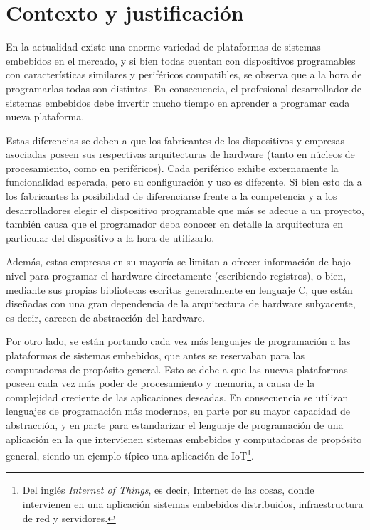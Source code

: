 \section{Contexto y justificación}
\label{sec:contextoYJustificacion}

En la actualidad existe una enorme variedad de plataformas de sistemas embebidos en el mercado, y si bien todas cuentan con dispositivos programables con características similares y periféricos compatibles, se observa que a la hora de programarlas todas son distintas. En consecuencia, el profesional desarrollador de sistemas embebidos debe invertir mucho tiempo en aprender a programar cada nueva plataforma.

Estas diferencias se deben a que los fabricantes de los dispositivos y empresas asociadas poseen sus respectivas arquitecturas de hardware (tanto en núcleos de procesamiento, como en periféricos). Cada periférico exhibe externamente la funcionalidad esperada, pero su configuración y uso es diferente. Si bien esto da a los fabricantes la posibilidad de diferenciarse frente a la competencia y a los desarrolladores elegir el dispositivo programable que más se adecue a un proyecto, también causa que el programador deba conocer en detalle la arquitectura en particular del dispositivo a la hora de utilizarlo.

Además, estas empresas en su mayoría se limitan a ofrecer información de bajo nivel para programar el hardware directamente (escribiendo registros), o bien, mediante sus propias bibliotecas escritas generalmente en lenguaje C, que están diseñadas con una gran dependencia de la arquitectura de hardware subyacente, es decir, carecen de abstracción del hardware.

Por otro lado, se están portando cada vez más lenguajes de programación a las plataformas de sistemas embebidos, que antes se reservaban para las computadoras de propósito general. Esto se debe a que las nuevas plataformas poseen cada vez más poder de procesamiento y memoria, a causa de la complejidad creciente de las aplicaciones deseadas. En consecuencia se utilizan lenguajes de programación más modernos, en parte por su mayor capacidad de abstracción, y en parte para estandarizar el lenguaje de programación de una aplicación en la que intervienen sistemas embebidos y computadoras de propósito general, siendo un ejemplo típico una aplicación de IoT\footnote{Del inglés \emph{Internet of Things}, es decir, Internet de las cosas, donde intervienen en una aplicación sistemas embebidos distribuidos, infraestructura de red y servidores.}.

